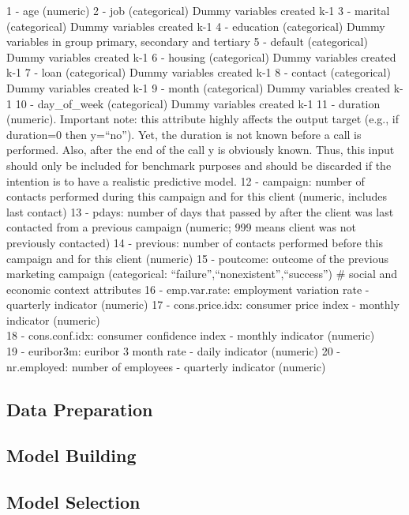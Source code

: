 \documentclass[english,man]{apa6}
\begin{document}
1 - age (numeric) 2 - job (categorical) Dummy variables created k-1 3 -
marital (categorical) Dummy variables created k-1 4 - education
(categorical) Dummy variables in group primary, secondary and tertiary 5
- default (categorical) Dummy variables created k-1 6 - housing
(categorical) Dummy variables created k-1 7 - loan (categorical) Dummy
variables created k-1 8 - contact (categorical) Dummy variables created
k-1 9 - month (categorical) Dummy variables created k-1 10 -
day\_of\_week (categorical) Dummy variables created k-1 11 - duration
(numeric). Important note: this attribute highly affects the output
target (e.g., if duration=0 then y=\enquote{no}). Yet, the duration is
not known before a call is performed. Also, after the end of the call y
is obviously known. Thus, this input should only be included for
benchmark purposes and should be discarded if the intention is to have a
realistic predictive model. 12 - campaign: number of contacts performed
during this campaign and for this client (numeric, includes last
contact) 13 - pdays: number of days that passed by after the client was
last contacted from a previous campaign (numeric; 999 means client was
not previously contacted) 14 - previous: number of contacts performed
before this campaign and for this client (numeric) 15 - poutcome:
outcome of the previous marketing campaign (categorical:
\enquote{failure},\enquote{nonexistent},\enquote{success}) \# social and
economic context attributes 16 - emp.var.rate: employment variation rate
- quarterly indicator (numeric) 17 - cons.price.idx: consumer price
index - monthly indicator (numeric)\\
 18 - cons.conf.idx: consumer confidence index - monthly indicator
(numeric)\\
 19 - euribor3m: euribor 3 month rate - daily indicator (numeric) 20 -
nr.employed: number of employees - quarterly indicator (numeric)

\subsection{Data Preparation}\label{data-preparation}

\subsection{Model Building}\label{model-building}

\subsection{Model Selection}\label{model-selection}
\end{document}
